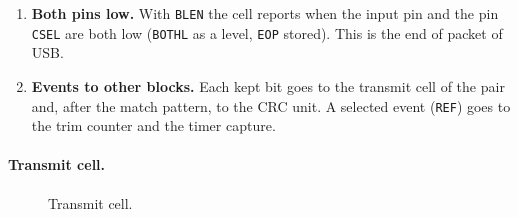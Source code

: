 \documentclass[10pt,a4paper]{article}
\newcommand{\reg}[1]{\texttt{#1}}
\begin{document}
\begin{enumerate}
accepted edge. \reg{IDLE} is then set and the receiver is reset: an incomplete frame is discarded and the search
for the match pattern starts again, so the next packet is aligned anew. Frames in the holding register are
kept. The receiver is also reset by the start of both pins low, by an inactive chip select and by clearing
\reg{RXEN}.
\item \textbf{Both pins low.} With \reg{BLEN} the cell reports when the input pin and the pin \reg{CSEL} are both
low (\reg{BOTHL} as a level, \reg{EOP} stored). This is the end of packet of USB.
\item \textbf{Events to other blocks.} Each kept bit goes to the transmit cell of the pair and, after the match
pattern, to the CRC unit. A selected event (\reg{REF}) goes to the trim counter and the timer capture.
\end{enumerate}

\paragraph{Transmit cell.}

\begin{figure}[H]
\centering
\resizebox{\textwidth}{!}{}
\caption{Transmit cell.}
\end{figure}
\end{document}
